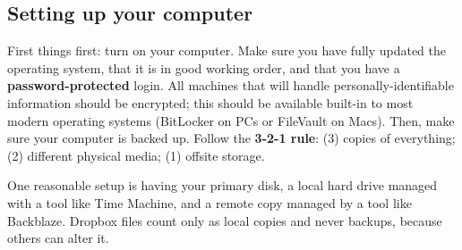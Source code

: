 \subsection{Setting up your computer}

First things first: turn on your computer.
Make sure you have fully updated the operating system,
that it is in good working order,
and that you have a \textbf{password-protected} login. 
All machines that will handle personally-identifiable information should be encrypted;
this should be available built-in to most modern operating systems (BitLocker on PCs or FileVault on Macs).
Then, make sure your computer is backed up.
Follow the \textbf{3-2-1 rule}:
(3) copies of everything;
(2) different physical media;
(1) offsite storage.

One reasonable setup is having your primary disk,
a local hard drive managed with a tool like Time Machine,
and a remote copy managed by a tool like Backblaze.
Dropbox files count only as local copies and never backups,
because others can alter it.


